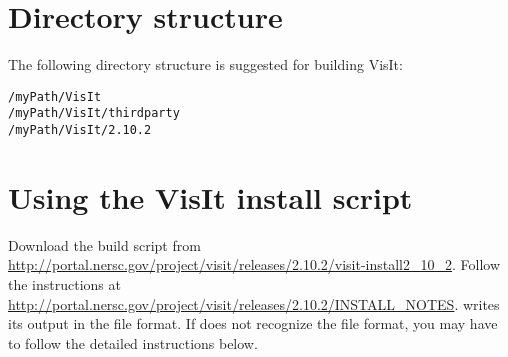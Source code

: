 \documentclass[11pt,fleqn]{book} %
\begin{document}
\section{Directory structure}
The following directory structure is suggested for building VisIt:

\begin{lstlisting}[backgroundcolor=\color{background}]
/myPath/VisIt
/myPath/VisIt/thirdparty
/myPath/VisIt/2.10.2
\end{lstlisting}

\section{Using the VisIt install script}
Download the build script from \\
\url{http://portal.nersc.gov/project/visit/releases/2.10.2/visit-install2_10_2}.
Follow the instructions at \url{http://portal.nersc.gov/project/visit/releases/2.10.2/INSTALL_NOTES}.
\Vaango writes its output in the \Uintah file format.  If \Visit does not recognize the
\Uintah file format, you may have to follow the detailed instructions below.
\end{document}
